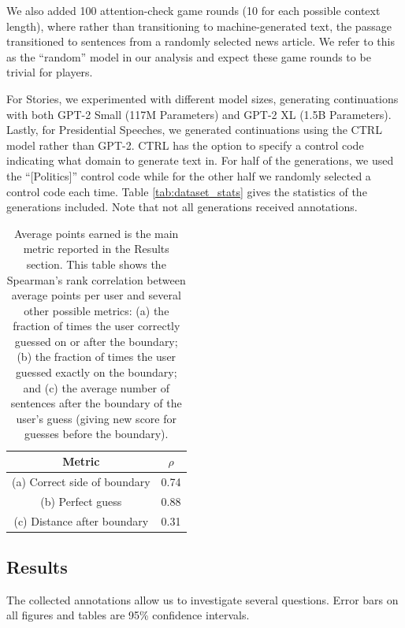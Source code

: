 We also added 100 attention-check game rounds (10 for each possible context length), where rather than transitioning to machine-generated text, the passage transitioned to sentences from a randomly selected news article.
We refer to this as the ``random'' model in our analysis and expect these game rounds to be trivial for players.

For Stories, we experimented with different model sizes, generating continuations with both GPT-2 Small (117M Parameters) and GPT-2 XL (1.5B Parameters).
Lastly, for Presidential Speeches, we generated continuations using the CTRL model \citep{keskar2019ctrl} rather than GPT-2.
CTRL has the option to specify a control code indicating what domain to generate text in. For half of the generations, we used the ``[Politics]'' control code while for the other half we randomly selected a control code each time.
Table \ref{tab:dataset_stats} gives the statistics of the generations included. Note that not all generations received annotations.


\begin{table}
    \centering
    \small
    \begin{tabular}{c|c}
    \toprule
    Metric & $\rho$ \\
    \midrule
    (a) Correct side of boundary &  0.74 \\
    (b) Perfect guess & 0.88 \\
    (c) Distance after boundary & 0.31  \\
    \bottomrule
    \end{tabular}
    \caption{Average points earned is the main metric reported in the Results section. This table shows the Spearman's rank correlation between average points per user and several other possible metrics: (a) the fraction of times the user correctly guessed on or after the boundary; (b) the fraction of times the user guessed exactly on the boundary; and (c) the average number of sentences after the boundary of the user's guess (giving new score for guesses before the boundary).}
    \label{tab:correlations_with_other_metrucs}
\end{table}

\subsection{Results}
\label{section:roft_results}
The collected annotations allow us to investigate several questions.
Error bars on all figures and tables are 95\% confidence intervals.

